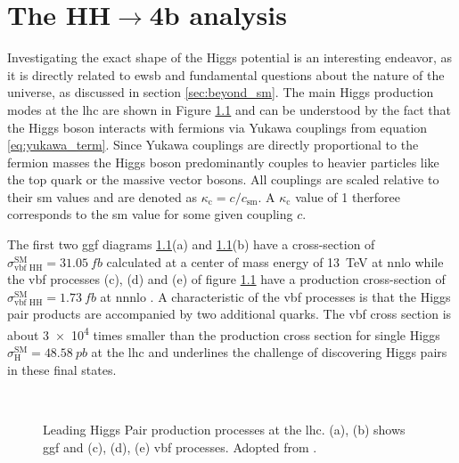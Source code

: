\chapter{The HH$\rightarrow$4b analysis}

Investigating the exact shape of the Higgs potential is an interesting endeavor, as it is directly related to \ac{ewsb} and fundamental questions about the nature of the universe, as discussed in section \ref{sec:beyond_sm}. The main Higgs production modes at the \ac{lhc} are shown in Figure \ref{fig:main_production_processes} and can be understood by the fact that the Higgs boson interacts with fermions via Yukawa couplings from equation \ref{eq:yukawa_term}. Since Yukawa couplings are directly proportional to the fermion masses the Higgs boson predominantly couples to heavier particles like the top quark or the massive vector bosons. All couplings are scaled relative to their \ac{sm} values and are denoted as $\kappa_\mathrm{c} = c/c_\mathrm{sm}$. A $\kappa_\mathrm{c}$ value of 1 therforee corresponds to the \ac{sm} value for some given coupling $c$.

The first two \ac{ggf} diagrams \ref{fig:main_production_processes}(a) and \ref{fig:main_production_processes}(b) have a cross-section of $\sigma_\text{vbf HH}^\text{SM}=\qty[]{31.05}{fb}$ calculated at a center of mass energy of \qty[]{13}{TeV} at \ac{nnlo} \citep{Grazzini_2018} while the \ac{vbf} processes (c), (d) and (e) of figure \ref{fig:main_production_processes} have a production cross-section of
$\sigma_\text{vbf HH}^\text{SM}=\qty[]{1.73}{fb}$ at \ac{nnnlo} \citep{PhysRevD.98.114016}. A characteristic of the \ac{vbf} processes is that the Higgs pair products are accompanied by two additional quarks. The \ac{vbf} cross section is about \qty[]{3e4}{} times smaller than the production cross section for single Higgs $\sigma_\text{H}^\text{SM}=\qty[]{48.58}{pb}$ at the \ac{lhc} \citep{de2016arxiv} and underlines the challenge of discovering Higgs pairs in these final states.
\begin{figure}
    \centering
    \hspace{.06\textwidth}
     \\
    \hspace{.01\textwidth}
    \hspace{.01\textwidth}
    \caption[]{Leading Higgs Pair production processes at the \ac{lhc}. (a), (b) shows \ac{ggf} and (c), (d), (e) \ac{vbf} processes. Adopted from \citep{aad2023search}.}
    \label{fig:main_production_processes}
\end{figure}

